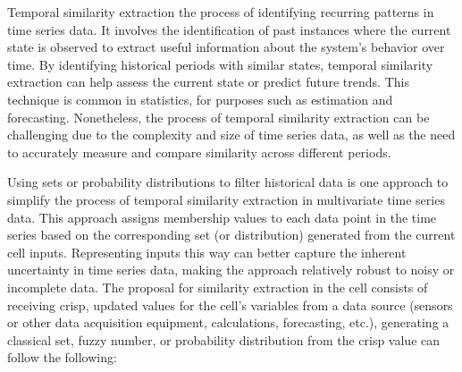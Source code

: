 Temporal similarity extraction the process of identifying recurring patterns in time series data. It involves the identification of past instances where the current state is observed to extract useful information about the system's behavior over time. By identifying historical periods with similar states, temporal similarity extraction can help assess the current state or predict future trends. This technique is common in statistics, for purposes such as estimation and forecasting. Nonetheless, the process of temporal similarity extraction can be challenging due to the complexity and size of time series data, as well as the need to accurately measure and compare similarity across different periods.


Using sets or probability distributions to filter historical data is one approach to simplify the process of temporal similarity extraction in multivariate time series data. This approach assigns membership values to each data point in the time series based on the corresponding set (or distribution) generated from the current cell inputs. Representing inputs this way can better capture the inherent uncertainty in time series data, making the approach relatively robust to noisy or incomplete data. The proposal for similarity extraction in the cell consists of receiving crisp, updated values for the cell's variables from a data source (sensors or other data acquisition equipment, calculations, forecasting, etc.), generating a classical set, fuzzy number, or probability distribution from the crisp value can follow the following:

